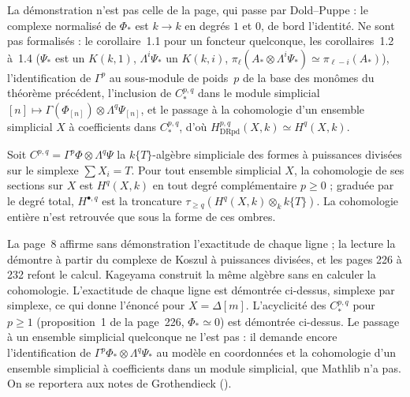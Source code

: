 {\small La démonstration n'est pas celle de la page, qui passe par Dold--Puppe : le complexe normalisé de $\Phi_*$ est $k \to k$ en degrés $1$ et $0$, de bord l'identité. Ne sont pas formalisés : le corollaire~1.1 pour un foncteur quelconque, les corollaires~1.2 à~1.4 ($\Psi_*$ est un $K(k,1)$, $\Lambda^i\Psi_*$ un $K(k,i)$, $\pi_\ell(A_* \otimes \Lambda^i\Psi_*) \simeq \pi_{\ell-i}(A_*)$), l'identification de $\Gamma^p$ au sous-module de poids~$p$ de la base des monômes du théorème précédent, l'inclusion de $C^{p,q}_*$ dans le module simplicial $[n] \mapsto \Gamma(\Phi_{[n]}) \otimes \Lambda^q\Psi_{[n]}$, et le passage à la cohomologie d'un ensemble simplicial $X$ à coefficients dans $C^{p,q}_*$, d'où $H^{p,q}_{\mathrm{DRpd}}(X, k) \simeq H^q(X, k)$.\par}

\begin{encadre}
\begin{theoreme*}\nonverifie
Soit $C^{p,q} = \Gamma^p\Phi \otimes \Lambda^q\Psi$ la $k\{T\}$-algèbre simpliciale des formes à puissances divisées sur le simplexe $\sum X_i = T$. Pour tout ensemble simplicial $X$, la cohomologie de ses sections sur $X$ est $H^q(X, k)$ en tout degré complémentaire $p \geq 0$ ; graduée par le degré total, $H^{\bullet,q}$ est la troncature $\tau_{\geq q}(H^q(X, k) \otimes_k k\{T\})$. La cohomologie entière n'est retrouvée que sous la forme de ces ombres.
\end{theoreme*}
\end{encadre}
{\small La page~8 affirme sans démonstration l'exactitude de chaque ligne ; la lecture la démontre à partir du complexe de Koszul à puissances divisées, et les pages 226 à 232 refont le calcul. Kageyama construit la même algèbre sans en calculer la cohomologie. L'exactitude de chaque ligne est démontrée ci-dessus, simplexe par simplexe, ce qui donne l'énoncé pour $X = \Delta[m]$. L'acyclicité des $C^{p,q}_*$ pour $p \geq 1$ (proposition~1 de la page~226, $\Phi_* \simeq 0$) est démontrée ci-dessus. Le passage à un ensemble simplicial quelconque ne l'est pas : il demande encore l'identification de $\Gamma^p\Phi_* \otimes \Lambda^q\Psi_*$ au modèle en coordonnées et la cohomologie d'un ensemble simplicial à coefficients dans un module simplicial, que Mathlib n'a pas. On se reportera aux notes de Grothendieck ().\par}

